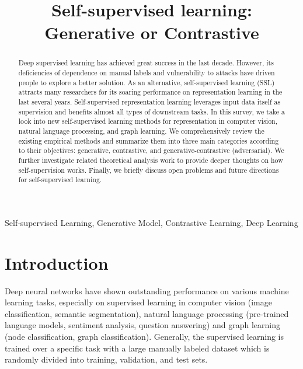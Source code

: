\documentclass[conference]{IEEEtran}
\begin{document}
\title{Self-supervised learning: Generative or Contrastive
}

\author{
}

\maketitle

\begin{abstract}
Deep supervised learning has achieved great success in the last decade.
However, its deficiencies of dependence on manual labels and vulnerability
to attacks have driven people to explore a better solution.
As an alternative, self-supervised learning (SSL) attracts many researchers
for its soaring performance on representation learning in the last several years.
Self-supervised representation learning leverages input data itself as
supervision and benefits almost all types of downstream tasks.
In this survey, we take a look into new self-supervised learning methods for 
representation in computer vision, natural language processing, and 
graph learning. We comprehensively review the existing empirical methods and 
summarize them into three main categories according to their objectives:
generative, contrastive, and generative-contrastive (adversarial).
We further investigate related theoretical analysis work to provide deeper 
thoughts on how self-supervision works.
Finally, we briefly discuss open problems and future directions for self-supervised 
learning.
\end{abstract}

\begin{IEEEkeywords}
Self-supervised Learning, Generative Model, Contrastive Learning, Deep Learning
\end{IEEEkeywords}

\section{Introduction}
Deep neural networks \cite{b1} have shown outstanding performance 
on various machine learning tasks, especially on supervised learning 
in computer vision (image classification, semantic segmentation),
natural language processing (pre-trained language models, sentiment
analysis, question answering) and graph learning (node classification,
graph classification).
Generally, the supervised learning is trained over a specific
task with a large manually labeled dataset which is randomly divided
into training, validation, and test sets.
\end{document}
